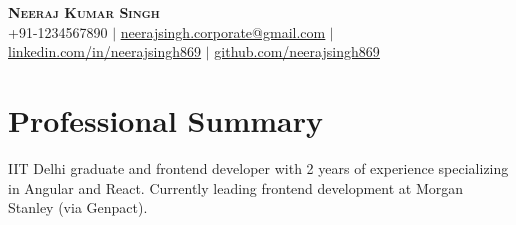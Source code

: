\documentclass[letterpaper,11pt]{article}
\begin{document}

\begin{center}
    \textbf{\Huge \scshape Neeraj Kumar Singh} \\ \vspace{1pt}
    \small +91-1234567890 $|$ \href{mailto:neerajsingh.corporate@gmail.com}{\underline{neerajsingh.corporate@gmail.com}} $|$ 
    \href{https://linkedin.com/in/neerajsingh869/}{\underline{linkedin.com/in/neerajsingh869}} $|$
    \href{https://github.com/neerajsingh869}{\underline{github.com/neerajsingh869}}
\end{center}

\section{Professional Summary}
IIT Delhi graduate and frontend developer with 2 years of experience specializing in Angular and React. Currently leading frontend development at Morgan Stanley (via Genpact).

\end{document}
